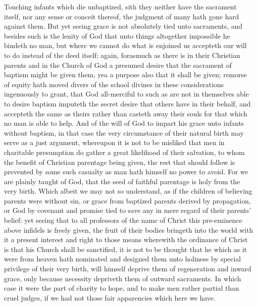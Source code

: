 Touching infants which die unbaptized, sith they  neither have the sacrament itself, nor any sense or conceit thereof, the judgment of many hath gone hard against them. But yet seeing grace is not absolutely tied unto sacraments, and besides such is the lenity of God that unto things altogether impossible he bindeth no man, but where we cannot do what is enjoined us accepteth our will to do instead of the deed itself; again, forasmuch as there is in their Christian parents and in the Church of God a presumed desire that the sacrament of baptism might be given them, yea a purpose also that it shall be given; remorse of equity hath moved divers of the school divines in these considerations ingenuously to grant, that God all-merciful to such as are not in themselves able to desire baptism imputeth the secret desire that others have in their behalf, and accepteth the same as theirs rather than casteth away their souls for that which no man is able to help.
And of the will of God to impart his grace unto infants without baptism, in that case the very circumstance of their natural birth may serve as a just argument, whereupon it is not to be misliked that men in charitable presumption do  gather a great likelihood of their salvation, to whom the benefit of Christian parentage being given, the rest that should follow is prevented by some such casualty as man hath himself no power to avoid. For we are plainly taught of God, that the seed of faithful parentage is holy from the very birth. Which albeit we may not so understand, as if the children of believing parents were without sin, or grace from baptized parents derived by propagation, or God by covenant and promise tied to save any in mere regard of their parents’ belief: yet seeing that to all professors of the name of Christ this pre-eminence above infidels is freely given, the fruit of their bodies bringeth into the world with it a present interest and right to those means wherewith the ordinance of Christ is that his Church shall be sanctified, it is not to be thought that he which as it were from heaven hath nominated and designed them unto holiness by special privilege of their very birth, will himself deprive them of regeneration and inward grace, only because necessity depriveth them of outward sacraments. In which case it were the part of charity to hope, and to make men rather partial than cruel judges, if we had not those fair apparencies which here we have.
